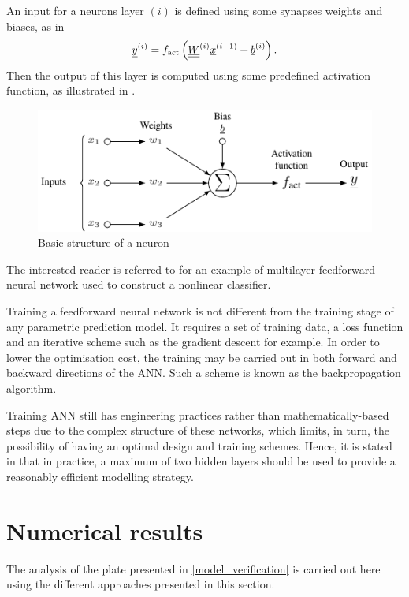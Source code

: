 An input for a neurons layer $(i)$ is defined using some synapses weights and biases, as in
\begin{equation}
	\underline{y}^{(i)} = f_{\rm act} \left( \underline{\underline{W}}^{(i)} \underline{x}^{(i-1)} + \underline{b}^{(i)} \right).
	\label{eq:ann_basic}
\end{equation}
Then the output of this layer is computed using some predefined activation function, as illustrated in .

\begin{figure}[hbt!]
	\centering
	\hspace*{-1cm}
	\includegraphics{./figures/pgd_toolbox_ann/ann_basic.pdf}
	\caption{Basic structure of a neuron}
	\label{fig_ann_basic}
\end{figure}
The interested reader is referred to \parencite{theodoridis} for an example of multilayer feedforward neural network used to construct a nonlinear classifier.

Training a feedforward neural network is not different from the training stage of any parametric prediction model. It requires a set of training data, a loss function and an iterative scheme such as the gradient descent for example. In order to lower the optimisation cost, the training may be carried out in both forward and backward directions of the ANN. Such a scheme is known as the backpropagation algorithm.

Training ANN still has engineering practices rather than mathematically-based steps due to the complex structure of these networks, which limits, in turn, the possibility of having an optimal design and training schemes. Hence, it is stated in \parencite{theodoridis} that in practice, a maximum of two hidden layers should be used to provide a reasonably efficient modelling strategy.

\section{Numerical results}
The analysis of the plate presented in \cref{model_verification} is carried out here using the different approaches presented in this section.

